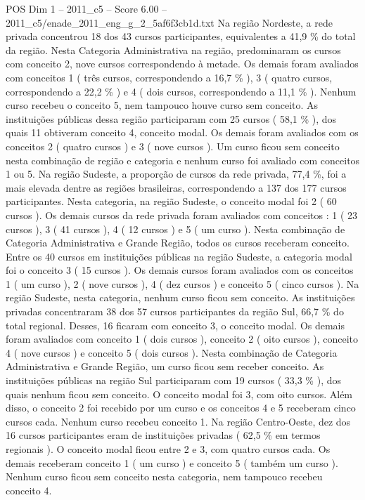 \begin{textsample}{POS Dim 1 – 2011\_c5 – Score 6.00 – 2011\_c5/enade\_2011\_eng\_g\_2\_5af6f3cb1d.txt}
Na região Nordeste, a rede privada concentrou 18 dos 43 cursos participantes, equivalentes a 41,9 \% do total da região.
Nesta Categoria Administrativa na região, predominaram os cursos com conceito 2, nove cursos correspondendo à metade.
Os demais foram avaliados com conceitos 1 ( três cursos, correspondendo a 16,7 \% ), 3 ( quatro cursos, correspondendo a 22,2 \% ) e 4 ( dois cursos, correspondendo a 11,1 \% ).
Nenhum curso recebeu o conceito 5, nem tampouco houve curso sem conceito.
As instituições públicas dessa região participaram com 25 cursos ( 58,1 \% ), dos quais 11 obtiveram conceito 4, conceito modal.
Os demais foram avaliados com os conceitos 2 ( quatro cursos ) e 3 ( nove cursos ).
Um curso ficou sem conceito nesta combinação de região e categoria e nenhum curso foi avaliado com conceitos 1 ou 5.
Na região Sudeste, a proporção de cursos da rede privada, 77,4 \%, foi a mais elevada dentre as regiões brasileiras, correspondendo a 137 dos 177 cursos participantes.
Nesta categoria, na região Sudeste, o conceito modal foi 2 ( 60 cursos ).
Os demais cursos da rede privada foram avaliados com conceitos : 1 ( 23 cursos ), 3 ( 41 cursos ), 4 ( 12 cursos ) e 5 ( um curso ).
Nesta combinação de Categoria Administrativa e Grande Região, todos os cursos receberam conceito.
Entre os 40 cursos em instituições públicas na região Sudeste, a categoria modal foi o conceito 3 ( 15 cursos ).
Os demais cursos foram avaliados com os conceitos 1 ( um curso ), 2 ( nove cursos ), 4 ( dez cursos ) e conceito 5 ( cinco cursos ).
Na região Sudeste, nesta categoria, nenhum curso ficou sem conceito.
As instituições privadas concentraram 38 dos 57 cursos participantes da região Sul, 66,7 \% do total regional.
Desses, 16 ficaram com conceito 3, o conceito modal.
Os demais foram avaliados com conceito 1 ( dois cursos ), conceito 2 ( oito cursos ), conceito 4 ( nove cursos ) e conceito 5 ( dois cursos ).
Nesta combinação de Categoria Administrativa e Grande Região, um curso ficou sem receber conceito.
As instituições públicas na região Sul participaram com 19 cursos ( 33,3 \% ), dos quais nenhum ficou sem conceito.
O conceito modal foi 3, com oito cursos.
Além disso, o conceito 2 foi recebido por um curso e os conceitos 4 e 5 receberam cinco cursos cada.
Nenhum curso recebeu conceito 1.
Na região Centro-Oeste, dez dos 16 cursos participantes eram de instituições privadas ( 62,5 \% em termos regionais ).
O conceito modal ficou entre 2 e 3, com quatro cursos cada.
Os demais receberam conceito 1 ( um curso ) e conceito 5 ( também um curso ).
Nenhum curso ficou sem conceito nesta categoria, nem tampouco recebeu conceito 4.

\end{textsample}
